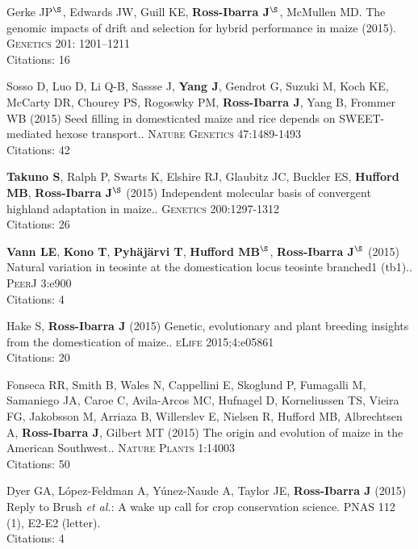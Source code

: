 \documentclass[letterpaper,10pt]{article}
\begin{document}
\begin{etaremune}
\item Gerke JP$^\S$, Edwards JW, Guill KE, {\bf Ross-Ibarra J}$^\S$, McMullen MD.  The genomic impacts of drift and selection for hybrid performance in maize (2015). \textsc{Genetics}  201: 1201–1211
\\Citations: 16\\


\item Sosso D, Luo D, Li Q-B, Sassse J, {\bf Yang J}, Gendrot G, Suzuki M, Koch KE, McCarty DR, Chourey PS, Rogoswky PM, {\bf Ross-Ibarra J}, Yang B, Frommer WB (2015) Seed filling in domesticated maize and rice depends on SWEET-mediated hexose transport.. \textsc{Nature Genetics} 47:1489-1493
\\Citations: 42\\


\item {\bf Takuno S}, Ralph P, Swarts K, Elshire RJ, Glaubitz JC, Buckler ES, {\bf Hufford MB}, {\bf Ross-Ibarra J}$^\S$ (2015) Independent molecular basis of convergent highland adaptation in maize.. \textsc{Genetics} 200:1297-1312
\\Citations: 26\\


\item {\bf Vann LE}, {\bf Kono T}, {\bf Pyh\"aj\"arvi T}, {\bf Hufford MB}$^\S$, {\bf Ross-Ibarra J}$^\S$ (2015) Natural variation in teosinte at the domestication locus teosinte branched1 (tb1).. \textsc{PeerJ} 3:e900
\\Citations: 4\\


\item Hake S, {\bf Ross-Ibarra J} (2015) Genetic, evolutionary and plant breeding insights from the domestication of maize.. \textsc{eLife}  2015;4:e05861
\\Citations: 20\\


\item Fonseca RR, Smith B, Wales N, Cappellini E, Skoglund P, Fumagalli M, Samaniego JA, Caroe C, Avila-Arcos MC, Hufnagel D, Korneliussen TS, Vieira FG, Jakobsson M, Arriaza B, Willerslev E, Nielsen R, Hufford MB, Albrechtsen A,  {\bf Ross-Ibarra J}, Gilbert MT (2015) The origin and evolution of maize in the American Southwest.. \textsc{Nature Plants} 1:14003
\\Citations: 50\\

\item Dyer GA, L\'opez-Feldman A, Y\'unez-Naude A, Taylor JE, {\bf Ross-Ibarra J} (2015) Reply to Brush \emph{et al.}: A wake up call for crop conservation science. PNAS 112 (1), E2-E2 (letter).
\\Citations: 4\\



\end{etaremune}
\end{document}
